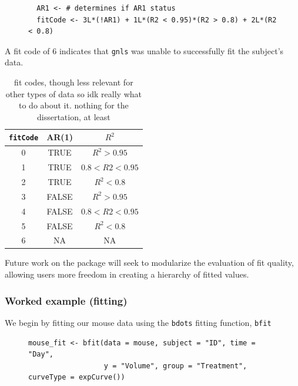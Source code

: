 \documentclass{article}
\newcommand{\xt}{\texttt}%
\begin{document}
\begin{singlespace}
\begin{figure}[H]
\centering
\begin{BVerbatim}
  AR1 <- # determines if AR1 status
  fitCode <- 3L*(!AR1) + 1L*(R2 < 0.95)*(R2 > 0.8) + 2L*(R2 < 0.8)
\end{BVerbatim}
\end{figure}
\end{singlespace}

A fit code of 6 indicates that \xt{gnls} was unable to successfully fit the subject's data. 

\begin{table}[h]
\centering
\def\arraystretch{1.5}
\begin{tabular}{|c|c|c|}
\hline
\xt{fitCode} & AR(1) & $R^2$ \\
\hline
0 & TRUE & $R^2 > 0.95$ \\
1 & TRUE & $0.8 < R2 < 0.95$ \\
2 & TRUE & $ R^2 <0.8$ \\
3 & FALSE & $R^2 >0.95$ \\
4 & FALSE & $0.8 < R2 < 0.95$ \\
5 & FALSE &$ R^2 <0.8$  \\
6 & NA & NA \\
\hline
\end{tabular}
\caption{fit codes, though less relevant for other types of data so idk really what to do about it. nothing for the dissertation, at least}
\label{tab:fit_codes}
\end{table}

Future work on the package will seek to modularize the evaluation of fit quality, allowing users more freedom in creating a hierarchy of fitted values. 


\subsubsection{Worked example (fitting)} 

We begin by fitting our mouse data using the \xt{bdots} fitting function, \xt{bfit}

\begin{singlespace}
\begin{figure}[H]
\centering
\begin{BVerbatim}
mouse_fit <- bfit(data = mouse, subject = "ID", time = "Day", 
                  y = "Volume", group = "Treatment", curveType = expCurve())
\end{BVerbatim}
\end{figure}
\end{singlespace}
\end{document}
